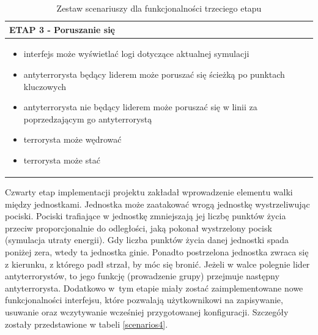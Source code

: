 \begin{table}
\begin{center}
\begin{tabular}{|p{}|}
\hline
ETAP 3 - Poruszanie się\\\hline
	\begin{itemize}
		\setlength\itemsep{0pt}
		\item interfejs może wyświetlać logi dotyczące aktualnej symulacji
		\item antyterrorysta będący liderem może poruszać się ścieżką po punktach kluczowych
		\item antyterrorysta nie będący liderem może poruszać się w linii za poprzedzającym go antyterrorystą
		\item terrorysta może wędrować
		\item terrorysta może stać
	\end{itemize}
\\\hline
\end{tabular}
\caption {Zestaw scenariuszy dla funkcjonalności trzeciego etapu\label{scenarios3}}
\end{center}
\end{table} 

Czwarty etap implementacji projektu zakładał wprowadzenie elementu walki między jednostkami. Jednostka może zaatakować wrogą jednostkę wystrzeliwując pociski. Pociski trafiające w jednostkę zmniejszają jej liczbę punktów życia przeciw proporcjonalnie do odległości, jaką pokonał wystrzelony pocisk (symulacja utraty energii). Gdy liczba punktów życia danej jednostki spada poniżej zera, wtedy ta jednostka ginie. Ponadto postrzelona jednostka zwraca się z kierunku, z którego padł strzał, by móc się bronić. Jeżeli w walce polegnie lider antyterrorystów, to jego funkcję (prowadzenie grupy) przejmuje następny antyterrorysta. Dodatkowo w~tym etapie miały zostać zaimplementowane nowe funkcjonalności interfejsu, które pozwalają użytkownikowi na zapisywanie, usuwanie oraz wczytywanie wcześniej przygotowanej konfiguracji. Szczegóły zostały przedstawione w tabeli \ref{scenarios4}.

